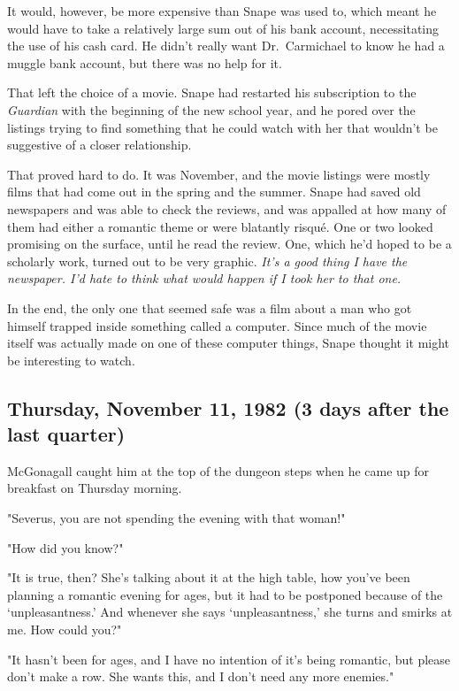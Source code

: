 It would, however, be more expensive than Snape was used to, which meant he would have to take a relatively large sum out of his bank account, necessitating the use of his cash card. He didn't really want Dr.~Carmichael to know he had a muggle bank account, but there was no help for it.

That left the choice of a movie. Snape had restarted his subscription to the \emph{Guardian} with the beginning of the new school year, and he pored over the listings trying to find something that he could watch with her that wouldn't be suggestive of a closer relationship.

That proved hard to do. It was November, and the movie listings were mostly films that had come out in the spring and the summer. Snape had saved old newspapers and was able to check the reviews, and was appalled at how many of them had either a romantic theme or were blatantly risqué. One or two looked promising on the surface, until he read the review. One, which he'd hoped to be a scholarly work, turned out to be very graphic. \emph{It's a good thing I have the newspaper. I'd hate to think what would happen if I took her to that one.}

In the end, the only one that seemed safe was a film about a man who got himself trapped inside something called a computer. Since much of the movie itself was actually made on one of these computer things, Snape thought it might be interesting to watch.

\subsection{Thursday, November 11, 1982 (3 days after the last quarter)}

McGonagall caught him at the top of the dungeon steps when he came up for breakfast on Thursday morning.

"Severus, you are not spending the evening with that woman!"

"How did you know?"

"It is true, then? She's talking about it at the high table, how you've been planning a romantic evening for ages, but it had to be postponed because of the `unpleasantness.' And whenever she says `unpleasantness,' she turns and smirks at me. How could you?"

"It hasn't been for ages, and I have no intention of it's being romantic, but please don't make a row. She wants this, and I don't need any more enemies."

